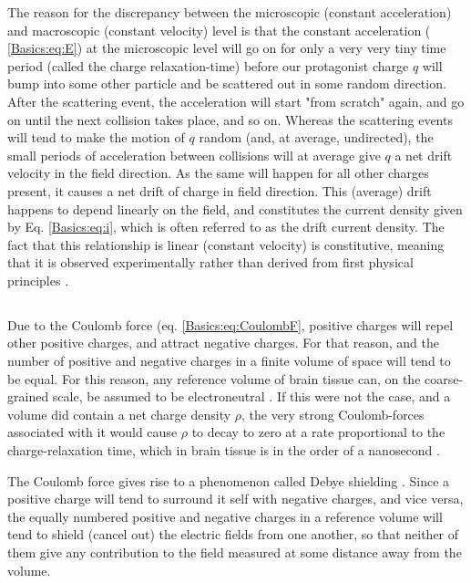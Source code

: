 The reason for the discrepancy between the microscopic (constant acceleration) and macroscopic (constant velocity) level is that the constant acceleration ( \ref{Basics:eq:E}) at the microscopic level will go on for only a very very tiny time period (called the charge relaxation-time) before our protagonist charge $q$ will bump into some other particle and be scattered out in some random direction. After the scattering event, the acceleration will start "from scratch" again, and go on until the next collision takes place, and so on. Whereas the scattering events will tend to make the motion of $q$ random (and, at average, undirected), the small periods of acceleration between collisions will at average give $q$ a net drift velocity in the field direction. As the same will happen for all other charges present, it causes a net drift of charge in field direction. This (average) drift happens to depend linearly on the field, and constitutes the current density given by Eq. \ref{Basics:eq:i}, which is often referred to as the drift current density. The fact that this relationship is linear (constant velocity) is constitutive, meaning that it is observed experimentally rather than derived from first physical principles \citep{Nunez2006, Pettersen2012}.


\subsection{}
Due to the Coulomb force (eq. \ref{Basics:eq:CoulombF}, positive charges will repel other positive charges, and attract negative charges. For that reason, and the number of positive and negative charges in a finite volume of space will tend to be equal. For this reason, any reference volume of brain tissue can, on the coarse-grained scale, be assumed to be electroneutral \cite{Nunez2006, Grodzinsky2011}. If this were not the case, and a volume did contain a net charge density $\rho$, the very strong Coulomb-forces associated with it would cause $\rho$ to decay to zero at a rate proportional to the charge-relaxation time, which in brain tissue is in the order of a nanosecond \cite{Grodzinsky2011}. 

The Coulomb force gives rise to a phenomenon called Debye shielding \cite{Nunez2006}. Since a positive charge will tend to surround it self with negative charges, and vice versa, the equally numbered positive and negative charges in a reference volume will tend to shield (cancel out) the electric fields from one another, so that neither of them give any contribution to the field measured at some distance away from the volume. 

